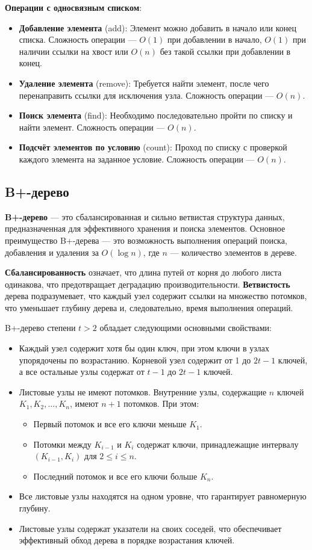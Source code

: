 \documentclass[11pt,a4paper,final]{article} %
\begin{document}
\textbf{Операции с односвязным списком}:
\begin{itemize}
	\item \textbf{Добавление элемента} (add): Элемент можно добавить в начало или конец списка. Сложность операции — $O(1)$ при добавлении в начало, $O(1)$ при наличии ссылки на хвост или $O(n)$ без такой ссылки при добавлении в конец.
	\item \textbf{Удаление элемента} (remove): Требуется найти элемент, после чего перенаправить ссылки для исключения узла. Сложность операции — $O(n)$.
	\item \textbf{Поиск элемента} (find): Необходимо последовательно пройти по списку и найти элемент. Сложность операции — $O(n)$.
	\item \textbf{Подсчёт элементов по условию} (count): Проход по списку с проверкой каждого элемента на заданное условие. Сложность операции — $O(n)$.
\end{itemize}


\subsection{B+-дерево}
\textbf{B+-дерево} — это сбалансированная и сильно ветвистая структура данных, предназначенная для эффективного хранения и поиска элементов. Основное преимущество B+-дерева — это возможность выполнения операций поиска, добавления и удаления за $O(\log n)$, где $n$ — количество элементов в дереве.

\textbf{Сбалансированность} означает, что длина путей от корня до любого листа одинакова, что предотвращает деградацию производительности. \textbf{Ветвистость} дерева подразумевает, что каждый узел содержит ссылки на множество потомков, что уменьшает глубину дерева и, следовательно, время выполнения операций.

B+-дерево степени $t > 2$ обладает следующими основными свойствами:
\begin{itemize}
	\item Каждый узел содержит хотя бы один ключ, при этом ключи в узлах упорядочены по возрастанию. Корневой узел содержит от 1 до $2t - 1$ ключей, а все остальные узлы содержат от $t - 1$ до $2t - 1$ ключей.
	\item Листовые узлы не имеют потомков. Внутренние узлы, содержащие $n$ ключей $K_1, K_2, ..., K_n$, имеют $n + 1$ потомков. При этом:
	\begin{itemize}
		\item Первый потомок и все его ключи меньше $K_1$.
		\item Потомки между $K_{i-1}$ и $K_i$ содержат ключи, принадлежащие интервалу $(K_{i-1}, K_i)$ для $2 \leq i \leq n$.
		\item Последний потомок и все его ключи больше $K_n$.
	\end{itemize}
	\item Все листовые узлы находятся на одном уровне, что гарантирует равномерную глубину.
	\item Листовые узлы содержат указатели на своих соседей, что обеспечивает эффективный обход дерева в порядке возрастания ключей.
\end{itemize}
\end{document}
